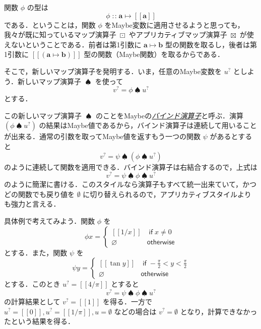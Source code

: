 \documentclass[a4paper]{jsbook}
\def\[{\left[\!\left[}
\def\]{\right]\!\right]}
\newcommand{\keyword}[1]{{\underline{\emph{#1}}}}
\newcommand{\mMaybeWith}[1]{\[#1\]}
\newcommand{\mType}[1]{\mathbf{#1}}
\newcommand{\mMaybeType}[1]{\mMaybeWith{\mType{#1}}}
\newcommand{\mNothing}{\emptyset}
\newcommand{\mPureNothing}{\varnothing}
\newcommand{\mKeyword}[1]{\mathsf{#1}}
\newcommand{\mIfKeyword}{\mKeyword{if}}
\newcommand{\mOtherwiseKeyword}{\mKeyword{otherwise}}
\newcommand{\mMaybe}[1]{{#1}^\text{?}}
\DeclareMathOperator{\mIn}{{:\!:}}
\DeclareMathOperator{\mMapsTo}{\mapsto}
\DeclareMathOperator{\mMapMaybe}{\boxdot}
\DeclareMathOperator{\mAppMapMaybe}{\boxtimes}
\DeclareMathOperator{\mBindMaybe}{\spadesuit}%
\DeclareMathOperator{\mIf}{\mIfKeyword}
\DeclareMathOperator{\mOtherwise}{\mOtherwiseKeyword}
\newcommand{\mProj}[2]{#1\mMapsTo#2}
\begin{document}
関数 $\phi$ の型は
\begin{equation}
\phi\mIn\mProj{\mType{a}}{\mMaybeType{a}}
\end{equation}
である．ということは，関数 $\phi$ をMaybe変数に適用させるようと思っても，我々が既に知っているマップ演算子 $\mMapMaybe$ やアプリカティブマップ演算子 $\mAppMapMaybe$ が使えないということである．前者は第1引数に $\mProj{\mType{a}}{\mType{b}}$ 型の関数を取るし，後者は第1引数に $\mMaybeWith{(\mProj{\mType{a}}{\mType{b}})}$ 型の関数（Maybe関数）を取るからである． %

そこで，新しいマップ演算子を発明する．いま，任意のMaybe変数を $\mMaybe{u}$ としよう．新しいマップ演算子 $\mBindMaybe$ を使って
\begin{equation}
\mMaybe{v}=\phi\mBindMaybe\mMaybe{u}
\end{equation}
とする．

この新しいマップ演算子 $\mBindMaybe$ のことをMaybeの\keyword{バインド演算子}と呼ぶ．演算 $(\phi\mBindMaybe\mMaybe{u})$ の結果はMaybe値であるから，バインド演算子は連続して用いることが出来る．通常の引数を取ってMaybe値を返すもう一つの関数 $\psi$ があるとすると
\begin{equation}
\mMaybe{v}=\psi\mBindMaybe{}(\phi\mBindMaybe\mMaybe{u})
\end{equation}
のように連続して関数を適用できる．バインド演算子は右結合するので，上式は
\begin{equation}
\label{eq:maybe-z-bind-style}
\mMaybe{v}=\psi\mBindMaybe\phi\mBindMaybe\mMaybe{u}
\end{equation}
のように簡潔に書ける．このスタイルなら演算子もすべて統一出来ていて，かつどの関数でも戻り値を $\mNothing$ に切り替えられるので，アプリカティブスタイルよりも強力と言える．

具体例で考えてみよう．関数 $\phi$ を
\begin{equation}
\phi x=\begin{cases}
\mMaybeWith{1/x}&\mIf x\neq0\\
\mPureNothing&\mOtherwise
\end{cases}
\end{equation}
とする．また，関数 $\psi$ を
\begin{equation}
\psi y=\begin{cases}
\mMaybeWith{\tan y}&\mIf -\frac{\pi}{2}<y<\frac{\pi}{2}\\
\mPureNothing&\mOtherwise
\end{cases}
\end{equation}
とする．このとき $\mMaybe{u}=\mMaybeWith{4/\pi}$ とすると
\begin{equation}
\mMaybe{v}=\psi\mBindMaybe\phi\mBindMaybe\mMaybe{u}
\end{equation}
の計算結果として $\mMaybe{v}=\mMaybeWith{1}$ を得る．一方で $\mMaybe{u}=\mMaybeWith{0},\mMaybe{u}=\mMaybeWith{1/\pi},u=\mNothing$ などの場合は $\mMaybe{v}=\mNothing$ となり，計算できなかったという結果を得る．
\end{document}
